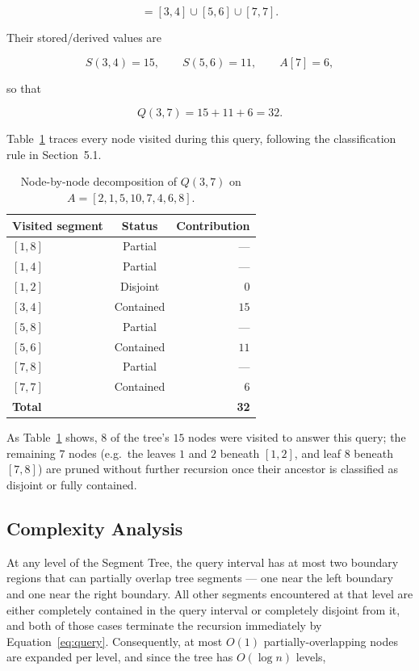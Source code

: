 \documentclass[11pt]{scrartcl}
\begin{document}
\begin{equation}
[3,7] = [3,4] \cup [5,6] \cup [7,7].
\end{equation}

Their stored/derived values are

\begin{equation}
S(3,4) = 15, \qquad S(5,6) = 11, \qquad A[7] = 6,
\end{equation}

so that

\begin{equation}
Q(3,7) = 15 + 11 + 6 = 32.
\end{equation}

Table~\ref{tab:decomp} traces every node visited during this query, following the classification rule in Section~5.1.

\begin{table}[h]
\centering
\caption{Node-by-node decomposition of $Q(3,7)$ on $A=[2,1,5,10,7,4,6,8]$.}
\label{tab:decomp}
\begin{tabular}{lcr}
\toprule
\textbf{Visited segment} & \textbf{Status} & \textbf{Contribution} \\
\midrule
$[1,8]$ & Partial   & --- \\
$[1,4]$ & Partial   & --- \\
$[1,2]$ & Disjoint  & $0$ \\
$[3,4]$ & Contained & $15$ \\
$[5,8]$ & Partial   & --- \\
$[5,6]$ & Contained & $11$ \\
$[7,8]$ & Partial   & --- \\
$[7,7]$ & Contained & $6$ \\
\midrule
\textbf{Total} & & \textbf{32} \\
\bottomrule
\end{tabular}
\end{table}

As Table~\ref{tab:decomp} shows, $8$ of the tree's $15$ nodes were visited to answer this query; the remaining $7$ nodes (e.g.\ the leaves $1$ and $2$ beneath $[1,2]$, and leaf $8$ beneath $[7,8]$) are pruned without further recursion once their ancestor is classified as disjoint or fully contained.

\subsection{Complexity Analysis}
\label{sec:overlap-argument}
At any level of the Segment Tree, the query interval has at most two boundary regions that can partially overlap tree segments --- one near the left boundary and one near the right boundary. All other segments encountered at that level are either completely contained in the query interval or completely disjoint from it, and both of those cases terminate the recursion immediately by Equation~\eqref{eq:query}. Consequently, at most $O(1)$ partially-overlapping nodes are expanded per level, and since the tree has $O(\log n)$ levels,
\end{document}
